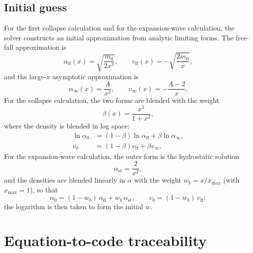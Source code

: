 \documentclass[11pt,a4paper]{article}
\begin{document}
\subsection{Initial guess}

For the first collapse calculation and for the expansion-wave
calculation, the solver constructs an initial approximation from
analytic limiting forms. The free-fall approximation is
\begin{equation}
\alpha_{\mathrm{ff}}(x)
=
\sqrt{\frac{m_0}{2x^3}},
\qquad
v_{\mathrm{ff}}(x)
=
-\sqrt{\frac{2m_0}{x}},
\label{eq:freefall}
\end{equation}
and the large-$x$ asymptotic approximation is
\begin{equation}
\alpha_{\infty}(x)
=
\frac{A}{x^2},
\qquad
v_{\infty}(x)
=
-\frac{A-2}{x}.
\label{eq:outerinitial}
\end{equation}
For the collapse calculation, the two forms are blended with the weight
\begin{equation}
\beta(x)=\frac{x^2}{1+x^2},
\end{equation}
where the density is blended in log space:
\begin{align}
\ln\alpha_0
&=
(1-\beta)\ln\alpha_{\mathrm{ff}}
+
\beta\ln\alpha_{\infty},
\\
v_0
&=
(1-\beta)v_{\mathrm{ff}}
+
\beta v_{\infty}.
\end{align}
For the expansion-wave calculation, the outer form is the hydrostatic
solution
\begin{equation}
\alpha_{\mathrm{st}}=\frac{2}{x^2},
\end{equation}
and the densities are blended linearly in $\alpha$ with the weight
$w_b = x/x_{\max}$ (with $x_{\max}=1$), so that
\begin{equation}
\alpha_0 = (1-w_b)\,\alpha_{\mathrm{ff}} + w_b\,\alpha_{\mathrm{st}},
\qquad
v_0 = (1-w_b)\,v_{\mathrm{ff}};
\end{equation}
the logarithm is then taken to form the initial $w$.

\section{Equation-to-code traceability}
\label{sec:traceability}
\end{document}
